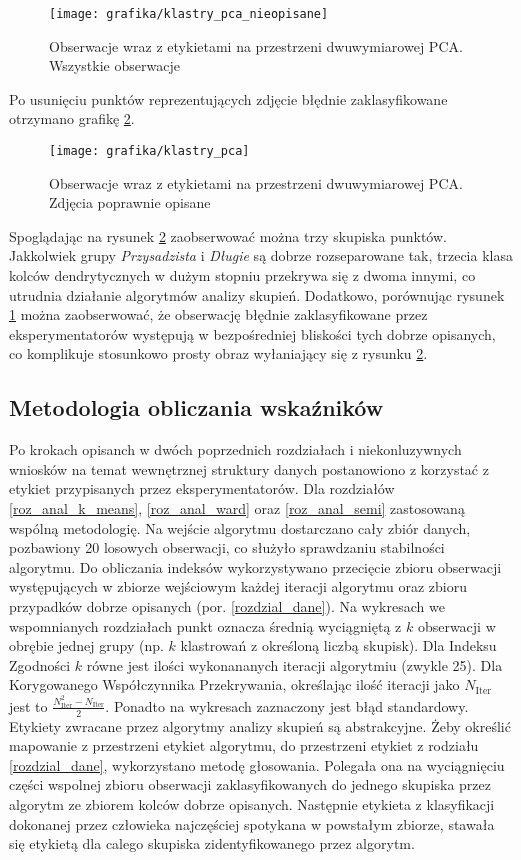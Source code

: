 \documentclass{article}
\begin{document}
\begin{figure}
\caption{Obserwacje wraz z etykietami na przestrzeni dwuwymiarowej PCA. Wszystkie obserwacje}
\label{pca_nieopisane}
\texttt{[image: grafika/klastry\_pca\_nieopisane]}
\end{figure}

Po usunięciu punktów reprezentujących zdjęcie błędnie zaklasyfikowane otrzymano grafikę \ref{pca_opisane}.
\begin{figure}
\caption{Obserwacje wraz z etykietami na przestrzeni dwuwymiarowej PCA. Zdjęcia poprawnie opisane}
\label{pca_opisane}
\texttt{[image: grafika/klastry\_pca]}
\end{figure}

Spoglądając na rysunek \ref{pca_opisane} zaobserwować można trzy skupiska punktów. Jakkolwiek grupy \textit{Przysadzista} i \textit{Długie} są dobrze rozseparowane tak, trzecia klasa kolców dendrytycznych w dużym stopniu przekrywa się z dwoma innymi, co utrudnia działanie algorytmów analizy skupień.
Dodatkowo, porównując rysunek \ref{pca_nieopisane} można zaobserwować, że obserwację błędnie zaklasyfikowane przez eksperymentatorów występują w bezpośredniej bliskości tych dobrze opisanych, co komplikuje stosunkowo prosty obraz wyłaniający się z rysunku \ref{pca_opisane}.
\subsection{Metodologia obliczania wskaźników}
Po krokach opisanch w dwóch poprzednich rozdziałach i niekonluzywnych wniosków na temat wewnętrznej struktury danych postanowiono z korzystać z etykiet przypisanych przez eksperymentatorów.
Dla rozdziałów \ref{roz_anal_k_means}, \ref{roz_anal_ward} oraz \ref{roz_anal_semi} zastosowaną wspólną metodologię.
Na wejście algorytmu dostarczano cały zbiór danych, pozbawiony 20 losowych obserwacji, co służyło sprawdzaniu stabilności algorytmu. 
Do obliczania indeksów wykorzystywano przecięcie zbioru obserwacji występujących w zbiorze wejściowym każdej iteracji algorytmu oraz zbioru przypadków dobrze opisanych (por. \ref{rozdzial_dane}).
Na wykresach we wspomnianych rozdziałach punkt oznacza średnią wyciągniętą z $k$ obserwacji w obrębie jednej grupy (np. $k$ klastrowań z określoną liczbą skupisk).
Dla Indeksu Zgodności $k$ równe jest ilości wykonananych iteracji algorytmiu (zwykle 25).
Dla Korygowanego Współczynnika Przekrywania, określając ilość iteracji jako $N_{\text{Iter}}$ jest to $\frac{N_\text{Iter}^2 - N_\text{Iter}}{2}$.
Ponadto na wykresach zaznaczony jest błąd standardowy.
Etykiety zwracane przez algorytmy analizy skupień są abstrakcyjne.
Żeby określić mapowanie z przestrzeni etykiet algorytmu, do przestrzeni etykiet z rodziału \ref{rozdzial_dane}, wykorzystano metodę głosowania.
Polegała ona na wyciągnięciu części wspolnej zbioru obserwacji zaklasyfikowanych do jednego skupiska przez algorytm ze zbiorem kolców dobrze opisanych.
Następnie etykieta z klasyfikacji dokonanej przez człowieka najczęściej spotykana w powstałym zbiorze, stawała się etykietą dla calego skupiska zidentyfikowanego przez algorytm.
\end{document}
